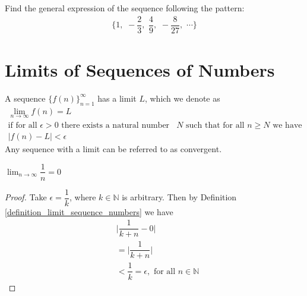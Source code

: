 \begin{exercise}
Find the general expression of the sequence following the pattern:
\begin{align*}
    \Big\{1, \hspace{4pt} -\dfrac{2}{3}, \hspace{4pt} \dfrac{4}{9}, \hspace{4pt} -\dfrac{8}{27}, \hspace{4pt} \cdots \Big\}
\end{align*}
\end{exercise}

\newpage
\section{Limits of Sequences of Numbers}\label{limits_of_sequences_of_numbers}

\begin{definition}
A sequence $\{f(n)\}_{n=1}^{\infty}$ has a limit $L$, which we denote as 
\begin{align*}
    \lim_{n \longrightarrow \infty} f(n) = L\\[2ex]
    \text{if for all} \hspace{4pt} \epsilon > 0 \hspace{4pt} \text{there exists a natural number} \hspace{4pt} &N \hspace{4pt} \text{such that for all} \hspace{4pt} n \geq N \hspace{4pt} \text{we have}\\[2ex]
    \lvert f(n) - L \rvert < \epsilon
\end{align*}
Any sequence with a limit can be referred to as convergent.
\label{definition_limit_sequence_numbers}
\end{definition}

\begin{example}
$\lim_{n \longrightarrow \infty} \dfrac{1}{n} = 0$
\begin{proof}
Take $\epsilon = \dfrac{1}{k}$, where $k \in \mathbb{N}$ is arbitrary. Then by Definition \ref{definition_limit_sequence_numbers} we have
\begin{align*}
    &\Big\lvert \dfrac{1}{k+n} - 0 \Big\rvert\\[2ex]
    &= \Big\lvert \dfrac{1}{k+n} \Big\rvert\\[2ex]
    &< \dfrac{1}{k} = \epsilon, \hspace{4pt} \text{for all} \hspace{4pt} n \in \mathbb{N}
\end{align*}
\end{proof}
\label{limit_one_over_n}
\end{example}

